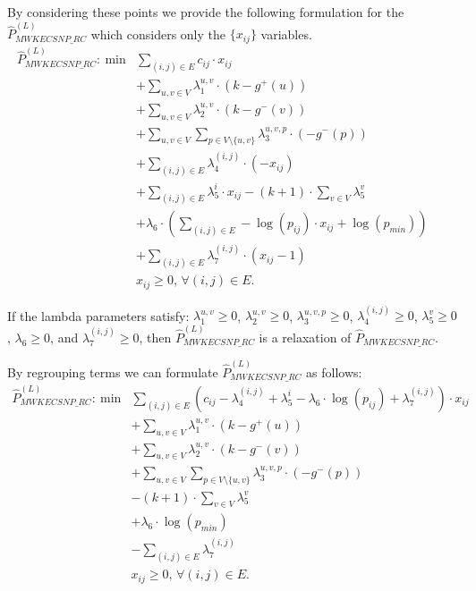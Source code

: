 By considering these points we provide the following formulation
for the $\hat{P}^{(L)}_{MWKECSNP\_RC}$ which considers only the
$\{x_{ij}\}$ variables.
\begin{align}
 \hat{P}^{(L)}_{MWKECSNP\_RC}:~ \mathrm{min} &  \sum_{(i,j)\in E} c_{ij}\cdot x_{ij}   \nonumber\\
 &                  + \sum_{u,v\in V} \lambda^{u,v}_{1}\cdot (k-g^{+}(u)) & \nonumber &\\
 &                  + \sum_{u,v\in V} \lambda^{u,v}_{2}\cdot (k-g^{-}(v)) & \nonumber &\\
 &                  + \sum_{u,v\in V} \sum_{p\in V\setminus \{u,v\}} \lambda^{u,v,p}_{3}\cdot (-g^{-}(p)) & \nonumber &\\
 &                  + \sum_{(i,j)\in E} \lambda^{(i,j)}_{4}\cdot (-x_{ij}) & \nonumber &\\
 &                  + \sum_{(i,j)\in E} \lambda^{i}_{5}\cdot x_{ij}-(k+1)\cdot \sum_{v\in V} \lambda^{v}_{5}  & \nonumber &\\
 &                  + \lambda_{6}\cdot \left(\sum_{(i,j)\in E} -\log(p_{ij})\cdot x_{ij}+\log(p_{min})\right)  & \nonumber &\\
 &                  + \sum_{(i,j)\in E} \lambda^{(i,j)}_{7}\cdot \left(x_{ij}-1\right)  & \nonumber &\\
 &                  x_{ij}\geq 0,\, \forall (i,j)\in E.   & \nonumber &
\end{align}
\begin{lemma} If the lambda parameters satisfy: $\lambda^{u,v}_{1}\geq 0$, $\lambda^{u,v}_{2}\geq
0$, $\lambda^{u,v,p}_{3}\geq 0$, $\lambda^{(i,j)}_{4}\geq 0$,
$\lambda^{v}_{5}\geq 0$, $\lambda_{6}\geq 0$, and
$\lambda^{(i,j)}_{7}\geq 0$, then $\hat{P}^{(L)}_{MWKECSNP\_RC}$
is a relaxation of $\hat{P}_{MWKECSNP\_RC}$.
\end{lemma}
By regrouping terms we can formulate $\hat{P}^{(L)}_{MWKECSNP\_RC}$ as follows:
\begin{align}
 \hat{P}^{(L)}_{MWKECSNP\_RC}:~ \mathrm{min} &  \sum_{(i,j)\in E} \left(c_{ij}-\lambda^{(i,j)}_{4}+\lambda^{i}_{5}-\lambda_{6}\cdot \log(p_{ij})+\lambda^{(i,j)}_{7}\right)\cdot x_{ij}   \nonumber\\
 &                  + \sum_{u,v\in V} \lambda^{u,v}_{1}\cdot (k-g^{+}(u)) & \nonumber &\\
 &                  + \sum_{u,v\in V} \lambda^{u,v}_{2}\cdot (k-g^{-}(v)) & \nonumber &\\
 &                  + \sum_{u,v\in V} \sum_{p\in V\setminus \{u,v\}} \lambda^{u,v,p}_{3}\cdot (-g^{-}(p)) & \nonumber &\\
 &                  -(k+1)\cdot \sum_{v\in V} \lambda^{v}_{5}  & \nonumber &\\
 &                  + \lambda_{6}\cdot \log(p_{min})  & \nonumber &\\
 &                  - \sum_{(i,j)\in E} \lambda^{(i,j)}_{7}  & \nonumber &\\
 &                  x_{ij}\geq 0,\, \forall (i,j)\in E.   & \nonumber &
\end{align}

